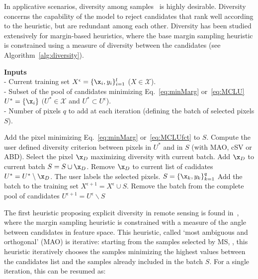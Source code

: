 In applicative scenarios, diversity among samples~ is highly desirable. Diversity concerns the capability of the model to reject candidates that rank well according to the heuristic, but are redundant among each other. Diversity has been studied extensively for margin-based heuristics, where the base margin sampling heuristic is constrained using a measure of diversity between the candidates (see Algorithm~\ref{alg:diversity}). 
\begin{algorithm}[!b]
\caption{General diversity based heuristic (for a single iteration)}
\label{alg:diversity}
\vspace{0.2cm}
\textbf{Inputs}\\
- Current training set $X^{\epsilon} = \{\x_i,y_i\}_{i=1}^l$ ($X \in \mathcal{X}$).\\
- Subset of the pool of candidates minimizing Eq.~\eqref{eq:minMarg} or~\eqref{eq:MCLU} $U^* = \{\x_i\}$ $ (U^* \in \mathcal{X}$ and $U^* \subset U^{\epsilon}$).\\
- Number of pixels $q$ to add at each iteration (defining the batch of selected pixels $S$).
\vspace{0.2cm}
\begin{algorithmic}[1]
\STATE Add the pixel minimizing Eq.~\eqref{eq:minMarg} or~\eqref{eq:MCLUfct} to $S$.
\REPEAT{}
	\STATE Compute the user defined diversity criterion between pixels in $U^*$ and in $S$ (with MAO, cSV or ABD).
	\STATE Select the pixel $\x_D$ maximizing diversity with current batch.
	\STATE Add $\x_D$ to current batch $S = S \cup \x_D$.
	\STATE Remove $\x_D$ to current list of cadidates $U^* = U^* \setminus \x_D$.
\STATE The user labels the selected pixels.  $S = \{\x_k,y_k\}_{k=1}^q$
\STATE Add the batch to the training set $X^{\epsilon+1}=X^{\epsilon} \cup S$.
\STATE Remove the batch from the complete pool of candidates $U^{\epsilon+1}=U^{\epsilon} \backslash S$
\end{algorithmic}
\vspace{0.2cm}
\end{algorithm}
The first heuristic proposing explicit diversity in remote sensing is found in~, where the margin sampling heuristic is constrained with a measure of the angle between candidates in feature space. This heuristic, called `most ambiguous and orthogonal' (MAO) is iterative: starting from the samples selected by MS, , this heuristic iteratively chooses the samples minimizing the highest values between the candidates list and the samples already included in the batch  $S$. For a single iteration, this can be resumed as:
